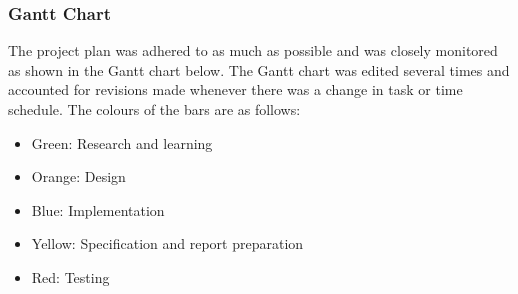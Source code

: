 \subsubsection{Gantt Chart}

The project plan was adhered to as much as possible and was closely monitored as shown in the Gantt chart below. The Gantt chart was edited several times and accounted for revisions made whenever there was a change in task or time schedule. The colours of the bars are as follows:

\begin{itemize}
	\item[] Green: Research and learning
	\item[] Orange: Design
	\item[] Blue: Implementation
	\item[] Yellow: Specification and report preparation
	\item[] Red: Testing
\end{itemize}

